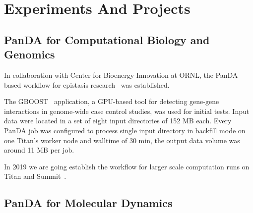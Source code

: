 \documentclass{webofc}
\begin{document}
\section{Experiments And Projects}
\subsection{PanDA for Computational Biology and Genomics} \label{section_biology}

In collaboration with Center for Bioenergy Innovation at ORNL, the PanDA based workflow for epistasis research~\cite{Gros277} was established.


The GBOOST~\cite{GBOOST} application, a GPU-based tool for detecting gene-gene interactions in genome-wide case control studies, was used for initial tests. Input data were located in a set of eight input directories of 152 MB each. 
Every PanDA job was configured to process single input directory in backfill mode on one Titan's worker node and walltime of 30 min, the output data volume was around 11 MB per job.

In 2019 we are going establish the workflow for larger scale computation runs on Titan and Summit~\cite{Summit}.

\subsection{PanDA for Molecular Dynamics} \label{section_moldyn}
\end{document}

